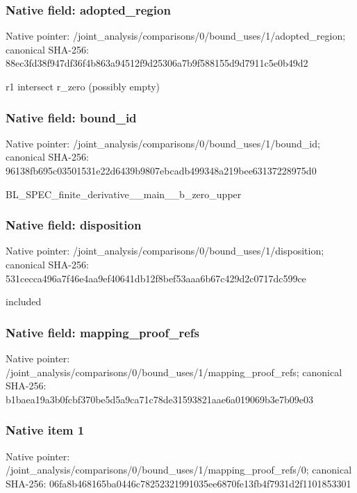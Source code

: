 \documentclass[10pt,a4paper]{article}
\begin{document}
\subsubsection{Native field: adopted\_\allowbreak{}region}
Native pointer: /joint\_\allowbreak{}analysis/comparisons/0/bound\_\allowbreak{}uses/1/adopted\_\allowbreak{}region; canonical SHA-256: 88ec3fd38f947df36f4b863a94512f9d25306a7b9f588155d9d7911c5e0b49d2

\begingroup\raggedright\sloppy r1 intersect r\_\allowbreak{}zero (possibly empty)\par\endgroup

\subsubsection{Native field: bound\_\allowbreak{}id}
Native pointer: /joint\_\allowbreak{}analysis/comparisons/0/bound\_\allowbreak{}uses/1/bound\_\allowbreak{}id; canonical SHA-256: 96138fb695c03501531e22d6439b9807ebcadb499348a219bee63137228975d0

\begingroup\raggedright\sloppy BL\_\allowbreak{}SPEC\_\allowbreak{}finite\_\allowbreak{}derivative\_\allowbreak{}\_\allowbreak{}main\_\allowbreak{}\_\allowbreak{}b\_\allowbreak{}zero\_\allowbreak{}upper\par\endgroup

\subsubsection{Native field: disposition}
Native pointer: /joint\_\allowbreak{}analysis/comparisons/0/bound\_\allowbreak{}uses/1/disposition; canonical SHA-256: 531cecca496a7f46e4aa9ef40641db12f8bef53aaa6b67c429d2c0717dc599ce

\begingroup\raggedright\sloppy included\par\endgroup

\subsubsection{Native field: mapping\_\allowbreak{}proof\_\allowbreak{}refs}
Native pointer: /joint\_\allowbreak{}analysis/comparisons/0/bound\_\allowbreak{}uses/1/mapping\_\allowbreak{}proof\_\allowbreak{}refs; canonical SHA-256: b1baea19a3b0fcbf370be5d5a9ca71c78de31593821aae6a019069b3e7b09e03

\subsubsection{Native item 1}
Native pointer: /joint\_\allowbreak{}analysis/comparisons/0/bound\_\allowbreak{}uses/1/mapping\_\allowbreak{}proof\_\allowbreak{}refs/0; canonical SHA-256: 06fa8b468165ba0446c78252321991035ee6870fe13fb4f7931d2f1101853301
\end{document}
